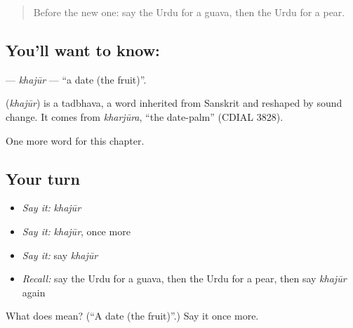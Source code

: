 \begin{quote}
Before the new one: say the Urdu for a guava, then the Urdu for a pear.
\end{quote}

\subsection*{You'll want to know: }
\textbf{} — \emph{khajūr} — \textquotedblleft{}a date (the fruit)\textquotedblright{}.

\begin{cousinweb}
\textbf{} (\emph{khajūr}) is a tadbhava, a word inherited from Sanskrit and reshaped by sound change. It comes from \emph{kharjūra}, \textquotedblleft{}the date-palm\textquotedblright{} (CDIAL 3828).
\end{cousinweb}

\begin{grammarlens}[title={What you've built}]
One more word for this chapter.
\end{grammarlens}

\subsection*{Your turn}
\begin{itemize}
\raggedright
  \item \emph{Say it:} \emph{khajūr}
  \item \emph{Say it:} \emph{khajūr}, once more
  \item \emph{Say it:} say \emph{khajūr}
  \item \emph{Recall:} say the Urdu for a guava, then the Urdu for a pear, then say \emph{khajūr} again
\end{itemize}

\begin{tcolorbox}[breakable,colback=teal!4,colframe=teal!35!black,title={Before you move on}]
What does  mean? (\textquotedblleft{}A date (the fruit)\textquotedblright{}.) Say it once more.
\end{tcolorbox}
